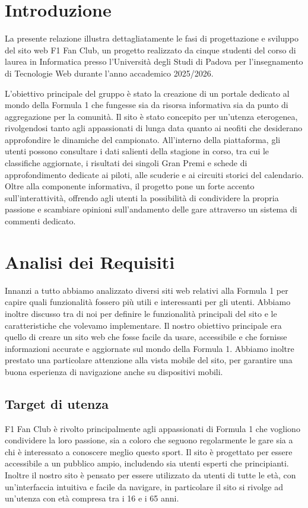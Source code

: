 \documentclass[11pt,a4paper]{article}
\begin{document}
\tableofcontents
\newpage



\section{Introduzione}
La presente relazione illustra dettagliatamente le fasi di progettazione e sviluppo del sito web F1 Fan Club, un progetto realizzato da cinque studenti del corso di laurea in Informatica presso l'Università degli Studi di Padova per l'insegnamento di Tecnologie Web durante l'anno accademico 2025/2026.

L'obiettivo principale del gruppo è stato la creazione di un portale dedicato al mondo della Formula 1 che fungesse sia da risorsa informativa sia da punto di aggregazione per la comunità. Il sito è stato concepito per un'utenza eterogenea, rivolgendosi tanto agli appassionati di lunga data quanto ai neofiti che desiderano approfondire le dinamiche del campionato. All'interno della piattaforma, gli utenti possono consultare i dati salienti della stagione in corso, tra cui le classifiche aggiornate, i risultati dei singoli Gran Premi e schede di approfondimento dedicate ai piloti, alle scuderie e ai circuiti storici del calendario. Oltre alla componente informativa, il progetto pone un forte accento sull'interattività, offrendo agli utenti la possibilità di condividere la propria passione e scambiare opinioni sull'andamento delle gare attraverso un sistema di commenti dedicato.

\section{Analisi dei Requisiti}
Innanzi a tutto abbiamo analizzato diversi siti web relativi alla Formula 1 per capire quali funzionalità fossero più utili e interessanti per gli utenti. Abbiamo inoltre discusso tra di noi per definire le funzionalità principali del sito e le caratteristiche che volevamo implementare.
Il nostro obiettivo principale era quello di creare un sito web che fosse facile da usare, accessibile e che fornisse informazioni accurate e aggiornate sul mondo della Formula 1. 
Abbiamo inoltre prestato una particolare attenzione alla vista mobile del sito, per garantire una buona esperienza di navigazione anche su dispositivi mobili.
\subsection{Target di utenza}
F1 Fan Club è rivolto principalmente agli appassionati di Formula 1 che vogliono condividere la loro passione, sia a coloro che seguono regolarmente le gare sia a chi è interessato a conoscere meglio questo sport. Il sito è progettato per essere accessibile a un pubblico ampio, includendo sia utenti esperti che principianti.
Inoltre il nostro sito è pensato per essere utilizzato da utenti di tutte le età, con un'interfaccia intuitiva e facile da navigare, in particolare il sito si rivolge ad un'utenza con età compresa tra i 16 e i 65 anni.
\end{document}
